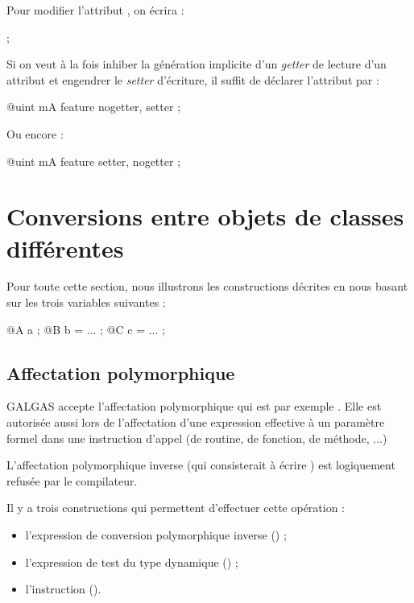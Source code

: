 Pour modifier l'attribut , on écrira :

\begin{galgascode}
[!?b setMA !12] ;
\end{galgascode}

Si on veut à la fois inhiber la génération implicite d'un \emph{getter} de lecture d'un attribut et engendrer le \emph{setter} d'écriture, il suffit de déclarer l'attribut par :

\begin{galgascode}
  @uint mA feature nogetter, setter ;
\end{galgascode}

Ou encore :

\begin{galgascode}
  @uint mA feature setter, nogetter ;
\end{galgascode}












\section{Conversions entre objets de classes différentes}

Pour toute cette section, nous illustrons les constructions décrites en nous basant sur les trois variables suivantes :

\begin{galgascode}
@A a ;
@B b = ... ;
@C c = ... ;
\end{galgascode}

\subsection{Affectation polymorphique}

GALGAS accepte l'affectation polymorphique qui est par exemple . Elle est autorisée aussi lors de l'affectation d'une expression effective à un paramètre formel dans une instruction d'appel (de routine, de fonction, de méthode, ...)

L'affectation polymorphique inverse (qui consisterait à écrire ) est logiquement refusée par le compilateur.

Il y a trois constructions qui permettent d'effectuer cette opération :
\begin{itemize}
  \item l'expression de conversion polymorphique inverse () ;
  \item l'expression de test du type dynamique () ;
  \item l'instruction  ().
\end{itemize}

